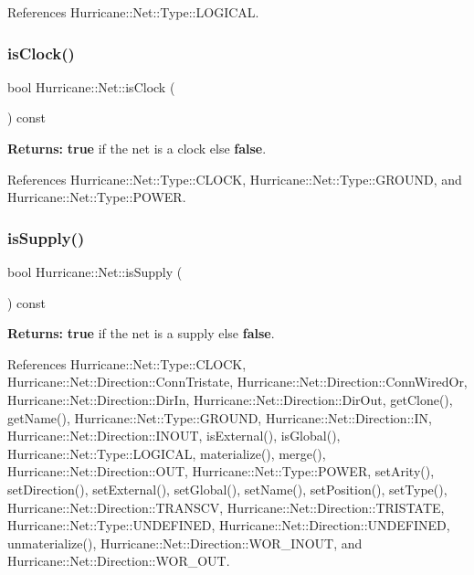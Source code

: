 References Hurricane\+::\+Net\+::\+Type\+::\+L\+O\+G\+I\+C\+AL.

\mbox{\label{classHurricane_1_1Net_a8807cc000bbbe1c340c71fcbfbb8fe33}} 
\subsubsection{\texorpdfstring{is\+Clock()}{isClock()}}
{\footnotesize\ttfamily bool Hurricane\+::\+Net\+::is\+Clock (\begin{DoxyParamCaption}{ }\end{DoxyParamCaption}) const\hspace{0.3cm}{\ttfamily [inline]}}

{\bfseries Returns\+:} {\bfseries true} if the net is a clock else {\bfseries false}. 

References Hurricane\+::\+Net\+::\+Type\+::\+C\+L\+O\+CK, Hurricane\+::\+Net\+::\+Type\+::\+G\+R\+O\+U\+ND, and Hurricane\+::\+Net\+::\+Type\+::\+P\+O\+W\+ER.

\mbox{\label{classHurricane_1_1Net_ab8947fc6c5093341958b94148407c2a2}} 
\subsubsection{\texorpdfstring{is\+Supply()}{isSupply()}}
{\footnotesize\ttfamily bool Hurricane\+::\+Net\+::is\+Supply (\begin{DoxyParamCaption}{ }\end{DoxyParamCaption}) const\hspace{0.3cm}{\ttfamily [inline]}}

{\bfseries Returns\+:} {\bfseries true} if the net is a supply else {\bfseries false}. 

References Hurricane\+::\+Net\+::\+Type\+::\+C\+L\+O\+CK, Hurricane\+::\+Net\+::\+Direction\+::\+Conn\+Tristate, Hurricane\+::\+Net\+::\+Direction\+::\+Conn\+Wired\+Or, Hurricane\+::\+Net\+::\+Direction\+::\+Dir\+In, Hurricane\+::\+Net\+::\+Direction\+::\+Dir\+Out, get\+Clone(), get\+Name(), Hurricane\+::\+Net\+::\+Type\+::\+G\+R\+O\+U\+ND, Hurricane\+::\+Net\+::\+Direction\+::\+IN, Hurricane\+::\+Net\+::\+Direction\+::\+I\+N\+O\+UT, is\+External(), is\+Global(), Hurricane\+::\+Net\+::\+Type\+::\+L\+O\+G\+I\+C\+AL, materialize(), merge(), Hurricane\+::\+Net\+::\+Direction\+::\+O\+UT, Hurricane\+::\+Net\+::\+Type\+::\+P\+O\+W\+ER, set\+Arity(), set\+Direction(), set\+External(), set\+Global(), set\+Name(), set\+Position(), set\+Type(), Hurricane\+::\+Net\+::\+Direction\+::\+T\+R\+A\+N\+S\+CV, Hurricane\+::\+Net\+::\+Direction\+::\+T\+R\+I\+S\+T\+A\+TE, Hurricane\+::\+Net\+::\+Type\+::\+U\+N\+D\+E\+F\+I\+N\+ED, Hurricane\+::\+Net\+::\+Direction\+::\+U\+N\+D\+E\+F\+I\+N\+ED, unmaterialize(), Hurricane\+::\+Net\+::\+Direction\+::\+W\+O\+R\+\_\+\+I\+N\+O\+UT, and Hurricane\+::\+Net\+::\+Direction\+::\+W\+O\+R\+\_\+\+O\+UT.


